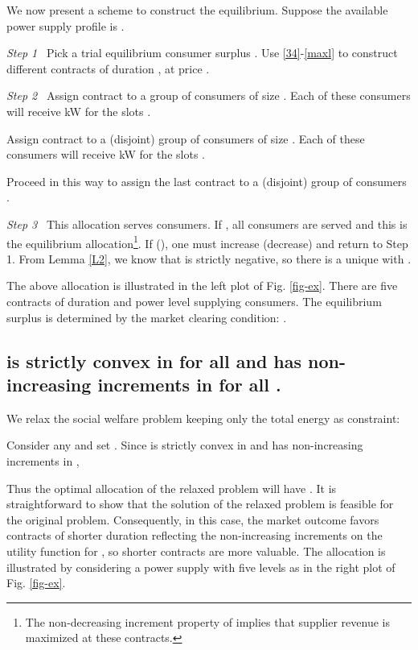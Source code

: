 \documentclass[10pt,draftcls,onecolumn]{IEEEtran}
\newcounter{l1}
\newcounter{l2}
\newcounter{l3}
\begin{document}
We now present a scheme to construct the equilibrium.  Suppose the available power supply profile is .

\textit{Step 1} \
Pick a trial equilibrium consumer surplus .  Use \eqref{34}-\eqref{maxl} to   construct  different contracts  of duration , at price .

\textit{Step 2} \
Assign contract  to a group of consumers of size .  Each of these consumers will receive kW
for the  slots .

Assign contract  to a (disjoint) group of consumers of size .  Each of these consumers will receive kW
for the  slots .

Proceed in this way to assign the last contract  to a (disjoint) group of consumers .

\textit{Step 3}  \ This allocation serves  consumers.  If , all consumers are served and this
is the equilibrium allocation\footnote{The non-decreasing increment property of  implies that supplier revenue is maximized at these contracts.}.  If  (), one must increase (decrease)  and return to Step 1.  From Lemma \ref{L2},
we know that  is strictly negative, so there is a unique  with .


The above allocation is illustrated in the  left plot of Fig. \ref{fig-ex}. There are five contracts of duration  and
power level  supplying  consumers.  The equilibrium surplus  is determined by the market
clearing condition: .
\subsection{ is strictly convex in  for all  and has non-increasing increments in  for all .} \label{sec:4b}
We relax the social welfare problem keeping only the total energy as constraint:

Consider any  and set . Since  is strictly convex in  and has non-increasing increments in , 

Thus the optimal allocation of the relaxed problem will have . It is straightforward to show that the solution of the relaxed problem is feasible for the original problem. Consequently, in this case, the market outcome  favors contracts of shorter duration reflecting the non-increasing increments on the utility function for , so shorter contracts are more valuable. The  allocation is illustrated by considering a power supply with five levels as in the right plot of Fig. \ref{fig-ex}.
\end{document}
